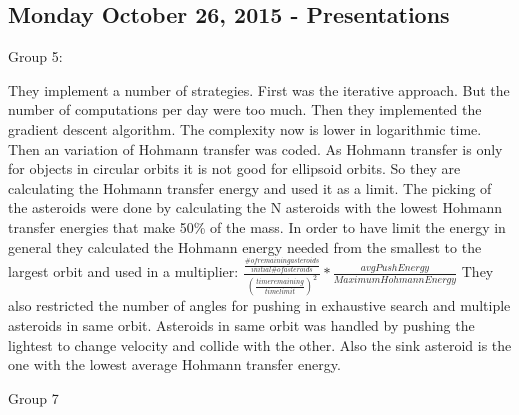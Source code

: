 \subsection{Monday October 26, 2015 - Presentations}

Group 5:

They implement a number of strategies. First was the iterative approach. But the
number of computations per day were too much. Then they implemented the gradient
descent algorithm. The complexity now is lower in logarithmic time. Then an 
variation of Hohmann transfer was coded. As Hohmann transfer is only for objects
in circular orbits it is not good for ellipsoid orbits. So they are calculating 
the Hohmann transfer energy and used it as a limit. The picking of the asteroids
were done by calculating the N asteroids with the lowest Hohmann transfer energies
that make 50\% of the mass. In order to have limit the energy in general they 
calculated the Hohmann energy needed from the smallest to the largest orbit and
used in a multiplier: $\frac{\frac{\# of remaining asteroids}{initial \# of asteroids}}{(\frac{time remaining}{time limit})^2}*\frac{avgPush Energy}{Maximum Hohmann Energy}$
They also restricted the number of angles for pushing in exhaustive search and
multiple asteroids in same orbit. Asteroids in same orbit was handled by pushing 
the lightest to change velocity and collide with the other. Also the sink asteroid 
is the one with the lowest average Hohmann transfer energy.

Group 7
